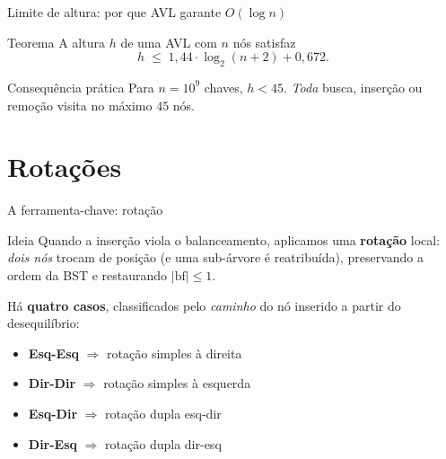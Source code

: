 \documentclass[aspectratio=169]{beamer}
\begin{document}
\begin{frame}{Limite de altura: por que AVL garante $O(\log n)$}
  \begin{block}{Teorema}
    A altura $h$ de uma AVL com $n$ nós satisfaz
    \[
      h \;\le\; 1{,}44 \cdot \log_2(n+2) + 0{,}672.
    \]
  \end{block}
  \begin{exampleblock}{Consequência prática}
    Para $n = 10^9$ chaves, $h < 45$.
    \emph{Toda} busca, inserção ou remoção visita no máximo $45$ nós.
  \end{exampleblock}
\end{frame}

\section{Rotações}

\begin{frame}{A ferramenta-chave: rotação}
  \begin{block}{Ideia}
    Quando a inserção viola o balanceamento, aplicamos uma
    \textbf{rotação} local: \emph{dois nós} trocam de posição
    (e uma sub-árvore é reatribuída), preservando a ordem da BST
    e restaurando $|\mathrm{bf}| \le 1$.
  \end{block}
  Há \textbf{quatro casos}, classificados pelo \emph{caminho}
  do nó inserido a partir do desequilíbrio:
  \begin{itemize}
    \item \textbf{Esq-Esq} $\Rightarrow$ rotação simples à direita
    \item \textbf{Dir-Dir} $\Rightarrow$ rotação simples à esquerda
    \item \textbf{Esq-Dir} $\Rightarrow$ rotação dupla esq-dir
    \item \textbf{Dir-Esq} $\Rightarrow$ rotação dupla dir-esq
  \end{itemize}
\end{frame}
\end{document}
